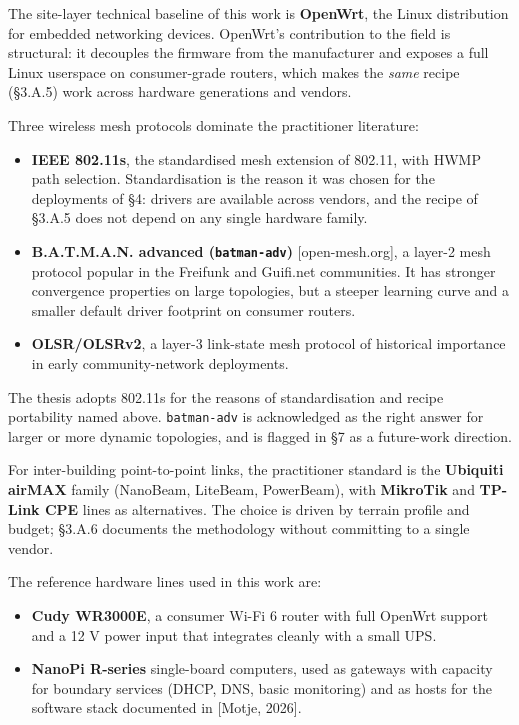 The site-layer technical baseline of this work is \textbf{OpenWrt}, the
Linux distribution for embedded networking devices. OpenWrt's
contribution to the field is structural: it decouples the firmware from
the manufacturer and exposes a full Linux userspace on consumer-grade
routers, which makes the \emph{same} recipe (§3.A.5) work across
hardware generations and vendors.

Three wireless mesh protocols dominate the practitioner literature:

\begin{itemize}
\tightlist
\item
  \textbf{IEEE 802.11s}, the standardised mesh extension of 802.11, with
  HWMP path selection. Standardisation is the reason it was chosen for
  the deployments of §4: drivers are available across vendors, and the
  recipe of §3.A.5 does not depend on any single hardware family.
\item
  \textbf{B.A.T.M.A.N. advanced (\texttt{batman-adv})}
  {[}open-mesh.org{]}, a layer-2 mesh protocol popular in the Freifunk
  and Guifi.net communities. It has stronger convergence properties on
  large topologies, but a steeper learning curve and a smaller default
  driver footprint on consumer routers.
\item
  \textbf{OLSR/OLSRv2}, a layer-3 link-state mesh protocol of historical
  importance in early community-network deployments.
\end{itemize}

The thesis adopts 802.11s for the reasons of standardisation and recipe
portability named above. \texttt{batman-adv} is acknowledged as the
right answer for larger or more dynamic topologies, and is flagged in §7
as a future-work direction.

For inter-building point-to-point links, the practitioner standard is
the \textbf{Ubiquiti airMAX} family (NanoBeam, LiteBeam, PowerBeam),
with \textbf{MikroTik} and \textbf{TP-Link CPE} lines as alternatives.
The choice is driven by terrain profile and budget; §3.A.6 documents the
methodology without committing to a single vendor.

The reference hardware lines used in this work are:

\begin{itemize}
\tightlist
\item
  \textbf{Cudy WR3000E}, a consumer Wi-Fi 6 router with full OpenWrt
  support and a 12 V power input that integrates cleanly with a small
  UPS.
\item
  \textbf{NanoPi R-series} single-board computers, used as gateways with
  capacity for boundary services (DHCP, DNS, basic monitoring) and as
  hosts for the software stack documented in {[}Motje, 2026{]}.
\end{itemize}

